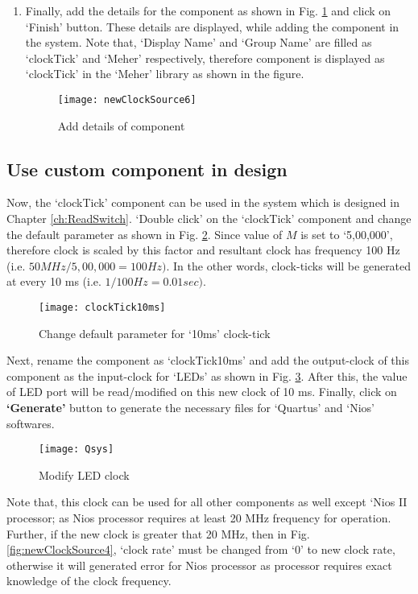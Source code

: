 \begin{enumerate}
	\item Finally, add the details for the component as shown in Fig. \ref{fig:newClockSource6} and click on `Finish' button. These details are displayed, while adding the component in the system. Note that, `Display Name' and `Group Name' are filled as `clockTick' and `Meher' respectively, therefore component is displayed as `clockTick' in the `Meher' library as shown in the figure.
	\begin{figure}[!h]
		\centering
		\texttt{[image: newClockSource6]}
		\caption{Add details of component}
		\label{fig:newClockSource6}
	\end{figure}
\end{enumerate}

\subsection{Use custom component in design}
Now, the `clockTick' component can be used in the system which is designed in Chapter \ref{ch:ReadSwitch}. `Double click' on the `clockTick' component and change the default parameter as shown in Fig. \ref{fig:clockTick10ms}. Since value of $M$ is set to `5,00,000', therefore clock is scaled by this factor and resultant clock has frequency 100 Hz (i.e. $50MHz/5,00,000 = 100 Hz)$. In the other words, clock-ticks will be generated at every 10 ms (i.e. $1/100Hz = 0.01 sec)$. 
\begin{figure}[!h]
	\centering
	\texttt{[image: clockTick10ms]}
	\caption{Change default parameter for `10ms' clock-tick}
	\label{fig:clockTick10ms}
\end{figure}

Next, rename the component as `clockTick10ms' and add the output-clock of this component as the input-clock for `LEDs' as shown in Fig. \ref{fig:Qsys}. After this, the value of LED port will be read/modified on this new clock of 10 ms. Finally, click on \textbf{`Generate'} button to generate the necessary files for `Quartus' and `Nios' softwares. 
\begin{figure}[!h]
	\centering
	\texttt{[image: Qsys]}
	\caption{Modify LED clock}
	\label{fig:Qsys}
\end{figure}

\begin{noNumBox}
	Note that, this clock can be used for all other components as well except `Nios II processor; as Nios processor requires at least 20 MHz frequency for operation. Further, if the new clock is greater that 20 MHz, then in Fig. \ref{fig:newClockSource4}, `clock rate' must be changed from `0' to new clock rate, otherwise it will generated error for Nios processor as processor requires exact knowledge of the clock frequency.
\end{noNumBox}
